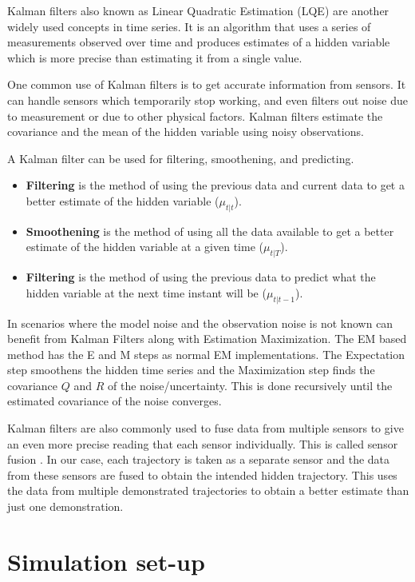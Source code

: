\documentclass[hidelinks,BTech]{iitmdiss}
\begin{document}
Kalman filters \cite{KalmanFilters} also known as Linear Quadratic Estimation (LQE) are another widely used concepts in time series. It is an algorithm that uses a series of measurements observed over time and produces estimates of a hidden variable which is more precise than estimating it from a single value.

One common use of Kalman filters is to get accurate information from sensors. It can handle sensors which temporarily stop working, and even filters out noise due to measurement or due to other physical factors. Kalman filters estimate the covariance and the mean of the hidden variable using noisy observations.

A Kalman filter can be used for filtering, smoothening, and predicting.
\begin{itemize}
\item{{\bf Filtering} is the method of using the previous data and current data to get a better estimate of the hidden variable ($\mu_{t|t}$).}
\item{{\bf Smoothening} is the method of using all the data available to get a better estimate of the hidden variable at a given time ($\mu_{t|T}$).}
\item{{\bf Filtering} is the method of using the previous data to predict what the hidden variable at the next time instant will be ($\mu_{t|t-1}$).}
\end{itemize}

In scenarios where the model noise and the observation noise is not known can benefit from Kalman Filters along with Estimation Maximization. The EM based method has the E and M steps as normal EM implementations. The Expectation step smoothens the hidden time series and the Maximization step finds the covariance $Q$ and $R$ of the noise/uncertainty. This is done recursively until the estimated covariance of the noise converges.

Kalman filters are also commonly used to fuse data from multiple sensors to give an even more precise reading that each sensor individually. This is called sensor fusion \cite{KalmanFiltersFusion}. In our case, each trajectory is taken as a separate sensor and the data from these sensors are fused to obtain the intended hidden trajectory. This uses the data from multiple demonstrated trajectories  to obtain a better estimate than just one demonstration.


\chapter{Simulation set-up}
\end{document}
